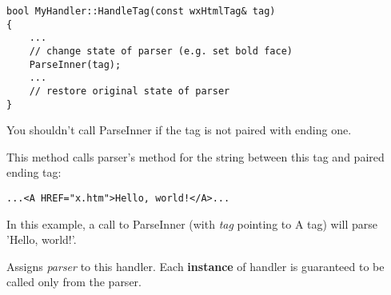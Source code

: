 \begin{verbatim}
bool MyHandler::HandleTag(const wxHtmlTag& tag)
{
    ...
    // change state of parser (e.g. set bold face)
    ParseInner(tag);
    ...
    // restore original state of parser
}
\end{verbatim}

You shouldn't call ParseInner if the tag is not paired with ending one.

\label{wxhtmltaghandlerparseinner}


This method calls parser's  method
for the string between this tag and paired ending tag:

\begin{verbatim}
...<A HREF="x.htm">Hello, world!</A>...
\end{verbatim}

In this example, a call to ParseInner (with {\it tag} pointing to A tag)
will parse 'Hello, world!'.

\label{wxhtmltaghandlersetparser}


Assigns {\it parser} to this handler. Each {\bf instance} of handler 
is guaranteed to be called only from the parser.

